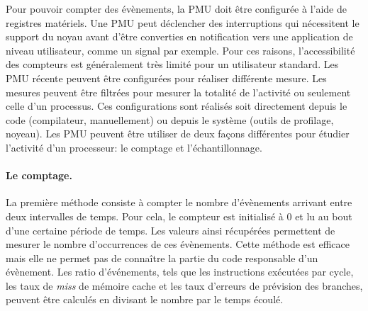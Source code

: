         
        Pour pouvoir compter des évènements, la PMU doit être configurée à l'aide de registres matériels. Une PMU peut déclencher des interruptions qui nécessitent le support du noyau avant d'être converties en notification vers une application de niveau utilisateur, comme un signal par exemple. Pour ces raisons, l'accessibilité des compteurs est généralement très limité pour un utilisateur standard. Les PMU récente peuvent être configurées pour réaliser différente mesure. Les mesures peuvent être filtrées pour mesurer la totalité de l'activité ou seulement celle d'un processus. Ces configurations sont réalisés soit directement depuis le code (compilateur, manuellement) ou depuis le système (outils de profilage, noyeau). Les PMU peuvent être utiliser de deux façons différentes pour étudier l'activité d'un processeur: le comptage et l'échantillonnage. 
        
        \paragraph{Le comptage.} La première méthode consiste à compter le nombre d'évènements arrivant entre deux intervalles de temps. Pour cela, le compteur est initialisé à $0$ et lu au bout d'une certaine période de temps. Les valeurs ainsi récupérées permettent de mesurer le nombre d'occurrences de ces évènements. Cette méthode est efficace mais elle ne permet pas de connaître la partie du code responsable d'un évènement. Les ratio d'événements, tels que les instructions exécutées par cycle, les taux de \textit{miss} de mémoire cache et les taux d'erreurs de prévision des branches, peuvent être calculés en divisant le nombre par le temps écoulé.
        
